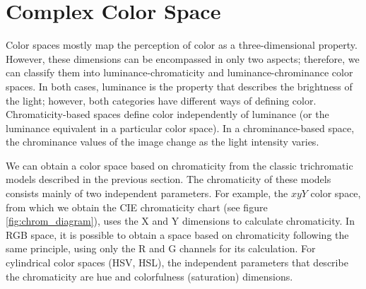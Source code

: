 \documentclass[journal]{IEEEtran}
\begin{document}
\section{Complex Color Space}
Color spaces mostly map the perception of color as a three-dimensional property. However, these dimensions can be encompassed in only two aspects; therefore, we can classify them into luminance-chromaticity and luminance-chrominance color spaces. In both cases, luminance is the property that describes the brightness of the light; however, both categories have different ways of defining color. Chromaticity-based spaces define color independently of luminance (or the luminance equivalent in a particular color space). In a chrominance-based space, the chrominance values of the image change as the light intensity varies.
  
We can obtain a color space based on chromaticity from the classic trichromatic models described in the previous section. The chromaticity of these models consists mainly of two independent parameters. For example, the $xyY$ color space, from which we obtain the CIE chromaticity chart (see figure \ref{fig:chrom_diagram}), uses the X and Y dimensions to calculate chromaticity. In RGB space, it is possible to obtain a space based on chromaticity following the same principle, using only the R and G channels for its calculation. For cylindrical color spaces (HSV, HSL), the independent parameters that describe the chromaticity are hue and colorfulness (saturation) dimensions.
\end{document}
